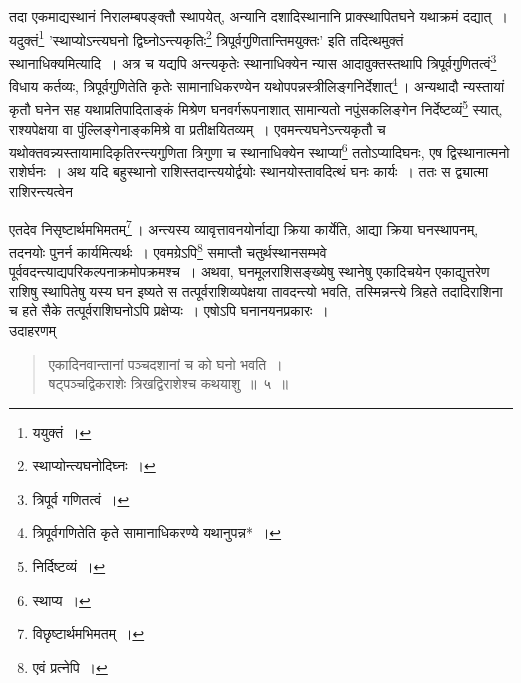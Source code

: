\documentclass[10pt, openany]{book}
\begin{document}
{तदा एकमाद्यस्थानं निरालम्बपङ्क्तौ स्थापयेत्, अन्यानि दशादिस्थानानि
प्राक्स्थापितघने}
{यथाक्रमं दद्यात्~। यदुक्तं\renewcommand{\thefootnote}{\s ७}\footnote{\s ययुक्तं~।} {\qt 'स्थाप्योऽन्त्यघनो द्विघ्नोऽन्त्यकृतिः\renewcommand{\thefootnote}{\s ८}\footnote{\s स्थाप्योन्त्यघनोदिघ्नः~।} त्रिपूर्वगुणितान्तिमयुक्तः'}}
{इति तदित्थमुक्तं स्थानाधिक्यमित्यादि~। अत्र च यद्यपि अन्त्यकृतेः
स्थानाधिक्येन}
{न्यास आदावुक्तस्तथापि त्रिपूर्वगुणितत्वं\renewcommand{\thefootnote}{\s ९}\footnote{\s त्रिपूर्व गणितत्वं~।} विधाय कर्तव्यः,
त्रिपूर्वगुणितेति कृतेः सामानाधिकरण्येन यथोपपन्नस्त्रीलिङ्गनिर्देशात्\renewcommand{\thefootnote}{\s १०}\footnote{\s त्रिपूर्वगणितेति कृते सामानाधिकरण्ये यथानुपन्न*~।}\,। अन्यथादौ न्यस्तायां
कृतौ घनेन सह यथाप्रतिपादिताङ्कं}
{मिश्रेण घनवर्गरूपनाशात् सामान्यतो नपुंसकलिङ्गेन निर्देष्टव्यं\renewcommand{\thefootnote}{\s ११}\footnote{\s निर्दिष्टव्यं~।}
स्यात्, राश्यपेक्षया वा पुंल्लिङ्गेनाङ्कमिश्रे वा प्रतीक्षयितव्यम्~। एवमन्त्यघनेऽन्त्यकृतौ च
यथोक्तवन्न्यस्तायामादिकृतिरन्त्यगुणिता}
{त्रिगुणा च स्थानाधिक्येन स्थाप्या\renewcommand{\thefootnote}{\s १२}\footnote{\s स्थाप्य~।} ततोऽप्यादिघनः, एष
द्विस्थानात्मनो राशेर्घनः~। अथ यदि}
{बहुस्थानो राशिस्तदान्त्ययोर्द्वयोः स्थानयोस्तावदित्थं घनः
कार्यः~। ततः स द्व्यात्मा राशिरन्त्यत्वेन}


\newpage

{एतदेव निसृष्टार्थमभिमतम्\renewcommand{\thefootnote}{\s १}\footnote{\s विछृष्टार्थमभिमतम्~।}\,। अन्त्यस्य व्यावृत्तावनयोर्नाद्या क्रिया
कार्येति, आद्या क्रिया}
{घनस्थापनम्, तदनयोः पुनर्न कार्यमित्यर्थः~। एवमग्रेऽपि\renewcommand{\thefootnote}{\s २}\footnote{\s एवं प्रत्नेपि~।}  समाप्तौ
चतुर्थस्थानसम्भवे पूर्ववदन्त्याद्यपरिकल्पनाक्रमोपक्रमश्च~। अथवा, घनमूलराशिसङ्ख्येषु स्थानेषु
एकादिचयेन एकाद्युत्तरेण}
{राशिषु स्थापितेषु यस्य घन इष्यते स तत्पूर्वराशिव्यपेक्षया तावदन्त्यो
भवति, तस्मिन्नन्त्ये त्रिहते}
{तदादिराशिना च हते सैके तत्पूर्वराशिघनोऽपि प्रक्षेप्यः~। एषोऽपि
घनानयनप्रकारः~।}\\

 {उदाहरणम्\textemdash}

\begin{quote}
    
{\eg एकादिनवान्तानां पञ्चदशानां च को घनो भवति~। \\
 षट्पञ्चद्विकराशेः त्रिखद्विराशेश्च कथयाशु~॥~५~॥}\end{quote}
\end{document}
